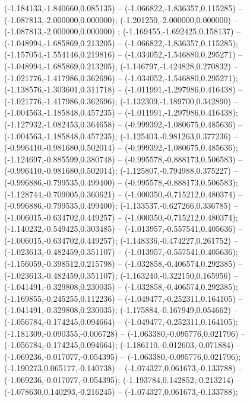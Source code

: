  (-1.184133,-1.840660,0.085135) -- (-1.066822,-1.836357,0.115285) -- (-1.087813,-2.000000,0.000000);
 (-1.201250,-2.000000,0.000000) -- (-1.087813,-2.000000,0.000000) ;
 (-1.169455,-1.692425,0.158137) -- (-1.048994,-1.685869,0.213205) -- (-1.066822,-1.836357,0.115285);
 (-1.157054,-1.554146,0.219816) -- (-1.034052,-1.546880,0.295271) -- (-1.048994,-1.685869,0.213205);
 (-1.146797,-1.424828,0.270832) -- (-1.021776,-1.417986,0.362696) -- (-1.034052,-1.546880,0.295271);
 (-1.138576,-1.303601,0.311718) -- (-1.011991,-1.297986,0.416438) -- (-1.021776,-1.417986,0.362696);
 (-1.132309,-1.189700,0.342890) -- (-1.004563,-1.185848,0.457235) -- (-1.011991,-1.297986,0.416438);
 (-1.127932,-1.082453,0.364658) -- (-0.999392,-1.080675,0.485636) -- (-1.004563,-1.185848,0.457235);
 (-1.125403,-0.981263,0.377236) -- (-0.996410,-0.981680,0.502014) -- (-0.999392,-1.080675,0.485636);
 (-1.124697,-0.885599,0.380748) -- (-0.995578,-0.888173,0.506583) -- (-0.996410,-0.981680,0.502014);
 (-1.125807,-0.794988,0.375227) -- (-0.996886,-0.799535,0.499400) -- (-0.995578,-0.888173,0.506583);
 (-1.128744,-0.709005,0.360621) -- (-1.000350,-0.715212,0.480374) -- (-0.996886,-0.799535,0.499400);
 (-1.133537,-0.627266,0.336785) -- (-1.006015,-0.634702,0.449257) -- (-1.000350,-0.715212,0.480374);
 (-1.140232,-0.549425,0.303485) -- (-1.013957,-0.557541,0.405636) -- (-1.006015,-0.634702,0.449257);
 (-1.148336,-0.474227,0.261752) -- (-1.023613,-0.482459,0.351107) -- (-1.013957,-0.557541,0.405636);
 (-1.156059,-0.398512,0.215798) -- (-1.032858,-0.406574,0.292385) -- (-1.023613,-0.482459,0.351107);
 (-1.163240,-0.322150,0.165956) -- (-1.041491,-0.329808,0.230035) -- (-1.032858,-0.406574,0.292385);
 (-1.169855,-0.245255,0.112236) -- (-1.049477,-0.252311,0.164105) -- (-1.041491,-0.329808,0.230035);
 (-1.175884,-0.167949,0.054662) -- (-1.056784,-0.174245,0.094664) -- (-1.049477,-0.252311,0.164105);
 (-1.181309,-0.090355,-0.006728) -- (-1.063380,-0.095776,0.021796) -- (-1.056784,-0.174245,0.094664);
 (-1.186110,-0.012603,-0.071884) -- (-1.069236,-0.017077,-0.054395) -- (-1.063380,-0.095776,0.021796);
 (-1.190273,0.065177,-0.140738) -- (-1.074327,0.061673,-0.133788) -- (-1.069236,-0.017077,-0.054395);
 (-1.193784,0.142852,-0.213214) -- (-1.078630,0.140293,-0.216245) -- (-1.074327,0.061673,-0.133788);
